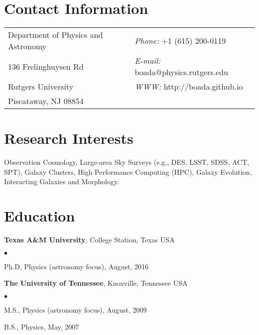 \documentclass[margin,line, 11pt]{res}
\newenvironment{list2}{
  \begin{list}{$\bullet$}{%
      \setlength{\itemsep}{0in}
      \setlength{\parsep}{0in} \setlength{\parskip}{0in}
      \setlength{\topsep}{0in} \setlength{\partopsep}{0in}
      \setlength{\leftmargin}{0.2in}}}{\end{list}}
\begin{document}

\begin{resume}
\section{Contact Information}
\vspace{.05in}
\begin{tabular}{@{}p{3in}p{3in}}
Department of Physics and Astronomy & {\it Phone:}  +1 (615) 200-0119 \\
136 Frelinghuysen Rd   & {\it E-mail:}  boada@physics.rutgers.edu \\
Rutgers University & {\it WWW:} http://boada.github.io \\
Piscataway, NJ 08854  & \\
\end{tabular}

\section{Research Interests}
Observation Cosmology, Large-area Sky Surveys (e.g., DES, LSST, SDSS, ACT, SPT), Galaxy Clusters, High Performance Computing (HPC), Galaxy Evolution, Interacting Galaxies and Morphology.
\vspace*{-3mm}

\section{Education}
\textbf{Texas A\&M University}, College Station, Texas USA\\
\vspace*{-4mm}
\begin{list2}
	\item Ph.D, Physics (astronomy focus), August, 2016
\end{list2}
\vspace*{-4mm}

\textbf{The University of Tennessee}, Knoxville, Tennessee USA\\
\vspace*{-4mm}
\begin{list2}
	\item M.S., Physics (astronomy focus),  August, 2009
	\item B.S., Physics,  May, 2007
\end{list2}
\vspace*{-2.5mm}


\end{resume}
\end{document}
